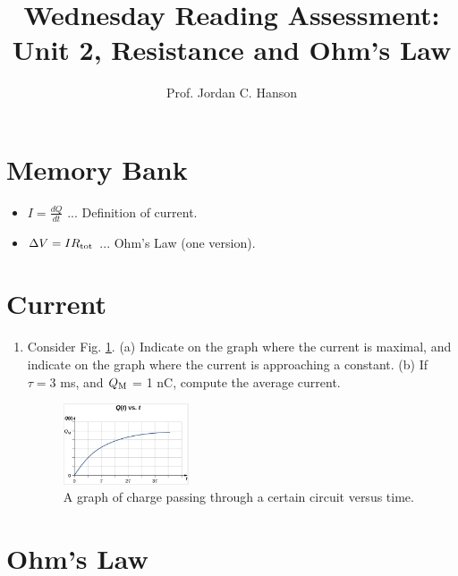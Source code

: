 \documentclass{article}
\begin{document}
\title{Wednesday Reading Assessment: Unit 2, Resistance and Ohm's Law}
\author{Prof. Jordan C. Hanson}

\maketitle

\section{Memory Bank}

\begin{itemize}
\item $I = \frac{dQ}{dt}$ ... Definition of current.
\item $\Delta V = I R_{\rm tot}$ ... Ohm's Law (one version).
\end{itemize}

\section{Current}

\begin{enumerate}
\item Consider Fig. \ref{fig:current1}.  (a) Indicate on the graph where the current is maximal, and indicate on the graph where the current is approaching a constant.  (b) If $\tau = 3$ ms, and $Q_{\rm M}$ = 1 nC, compute the average current.
\begin{figure}[ht]
\centering
\includegraphics[width=0.35\textwidth]{current1.png}
\caption{\label{fig:current1} A graph of charge passing through a certain circuit versus time.}
\end{figure}
\end{enumerate}

\section{Ohm's Law}
\end{document}
